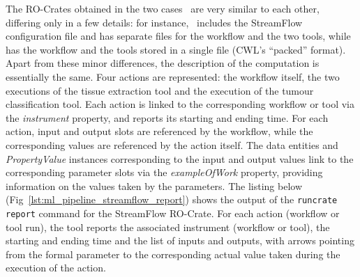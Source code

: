 \documentclass[10pt,letterpaper]{article}
\begin{document}
The RO-Crates obtained in the two cases~\cite{Colonnelli 2023, run-pathology}
are very similar to each other, differing only in a few details: for instance,~\cite{Colonnelli 2023} includes the StreamFlow configuration file and has separate files for the workflow and the two tools, while
\cite{run-pathology} has the workflow and the tools stored in a single file (CWL's ``packed'' format).
Apart from these minor differences, the description of the computation is essentially the same.
Four actions are represented: the workflow itself, the two executions of the tissue extraction tool and the execution of the tumour classification tool.
Each action is linked to the corresponding workflow or tool via the
\emph{instrument} property, and reports its starting and ending time. For each action, input and output slots are referenced by the workflow, while the corresponding values are referenced by the action itself.
The data entities and \emph{PropertyValue} instances corresponding to the input and output values link to the corresponding parameter slots via the \emph{exampleOfWork} property, providing information on the values taken by the parameters.
The listing below (Fig~\ref{lst:ml_pipeline_streamflow_report}) shows the output of the
\texttt{runcrate report} command for the StreamFlow RO-Crate. 
For each action (workflow or tool run), the tool reports the associated instrument (workflow or tool), the starting and ending time and the list of inputs and outputs, with arrows pointing from the formal parameter to the corresponding actual value taken during the execution of the action.
\end{document}
